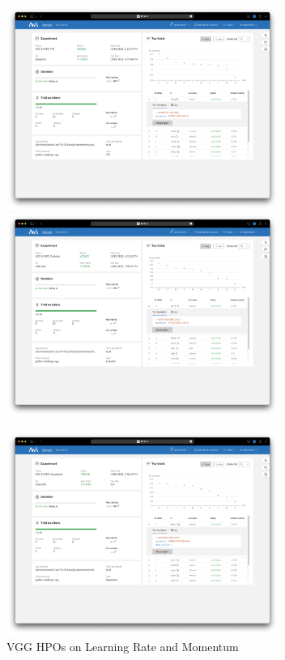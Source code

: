 \documentclass{article}
\begin{document}
\begin{figure}
    \centerline{\includegraphics[width=3.5in]{../proj3/figures/vgg_tpe_overview.png}\includegraphics[width=3.5in]{../proj3/figures/vgg_evolution_overview.png}}
    \centerline{\includegraphics[width=3.5in]{../proj3/figures/vgg_hyperband_overview.png}}
    \caption{VGG HPOs on Learning Rate and Momentum}
    \label{fig:vgg-all}
\end{figure}
\end{document}
